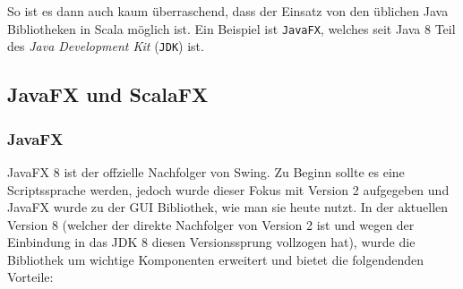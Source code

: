 So ist es dann auch kaum überraschend, dass der Einsatz von den üblichen Java Bibliotheken in Scala möglich ist. Ein Beispiel ist \texttt{JavaFX}, welches seit Java 8 Teil des \textit{Java Development Kit} (\texttt{JDK}) ist.

\subsection{JavaFX und ScalaFX}
\subsubsection{JavaFX}
JavaFX 8 ist der offzielle Nachfolger von Swing. Zu Beginn sollte es eine Scriptssprache werden, jedoch wurde dieser Fokus mit Version 2 aufgegeben und JavaFX wurde zu der GUI Bibliothek, wie man sie heute nutzt. In der aktuellen Version 8 (welcher der direkte Nachfolger von Version 2 ist und wegen der Einbindung in das JDK 8 diesen Versionssprung vollzogen hat), wurde die Bibliothek um wichtige Komponenten erweitert und bietet die folgendenden Vorteile:

